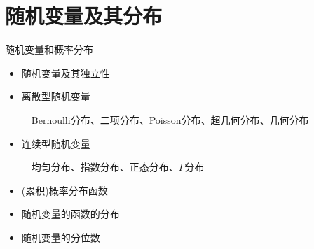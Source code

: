 \section{随机变量及其分布}
    
    \frame{\sectionpage}
    
    \begin{frame}{随机变量和概率分布}
   \begin{itemize}
   	\item 随机变量及其独立性
   	\item 离散型随机变量
   	
   		$\quad$Bernoulli分布、二项分布、Poisson分布、超几何分布、几何分布
   	\item 连续型随机变量
   	
   		$\quad$均匀分布、指数分布、正态分布、$\Gamma$分布
   		
   	\item (累积)概率分布函数
   	\item 随机变量的函数的分布
   	\item 随机变量的分位数
   \end{itemize}
\end{frame}
    
    